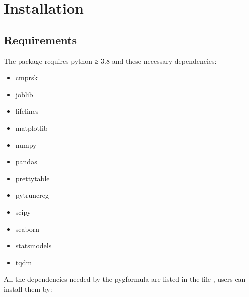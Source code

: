 \documentclass[letterpaper,10pt,english]{sphinxmanual}
\begin{document}
\chapter{Installation}
\label{\detokenize{Installation:installation}}\label{\detokenize{Installation::doc}}

\section{Requirements}
\label{\detokenize{Installation:requirements}}
\sphinxAtStartPar
The package requires python ≥ 3.8 and these necessary dependencies:
\begin{itemize}
\item {} 
\sphinxAtStartPar
cmprsk

\item {} 
\sphinxAtStartPar
joblib

\item {} 
\sphinxAtStartPar
lifelines

\item {} 
\sphinxAtStartPar
matplotlib

\item {} 
\sphinxAtStartPar
numpy

\item {} 
\sphinxAtStartPar
pandas

\item {} 
\sphinxAtStartPar
prettytable

\item {} 
\sphinxAtStartPar
pytruncreg

\item {} 
\sphinxAtStartPar
scipy

\item {} 
\sphinxAtStartPar
seaborn

\item {} 
\sphinxAtStartPar
statsmodels

\item {} 
\sphinxAtStartPar
tqdm

\end{itemize}

\sphinxAtStartPar
All the dependencies needed by the pygformula are listed in the file
 , users can
install them by:

\begin{sphinxVerbatim}[commandchars=\\\{\}]
   
\end{sphinxVerbatim}
\end{document}
